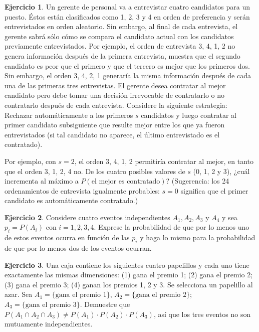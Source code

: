 \documentclass[
  11pt,
]{book}
\theoremstyle{definition}
\theoremstyle{definition}
\theoremstyle{definition}
\newtheorem{exercise}{Ejercicio}[chapter]
\theoremstyle{definition}
\theoremstyle{remark}
\begin{document}
\begin{exercise}
Un gerente de personal va a entrevistar cuatro candidatos para un puesto. Éstos están clasificados como 1, 2, 3 y 4 en orden de preferencia y serán entrevistados en orden aleatorio. Sin embargo, al final de cada entrevista, el gerente sabrá sólo cómo se compara el candidato actual con los candidatos previamente entrevistados. Por ejemplo, el orden de entrevista 3, 4, 1, 2 no genera información después de la primera entrevista, muestra que el segundo candidato es peor que el primero y que el tercero es mejor que los primeros dos. Sin embargo, el orden 3, 4, 2, 1 generaría la misma información después de cada una de las primeras tres entrevistas. El gerente desea contratar al mejor candidato pero debe tomar una decisión irrevocable de contratarlo o no contratarlo después de cada entrevista. Considere la siguiente estrategia: Rechazar automáticamente a los primeros \(s\) candidatos y luego contratar al primer candidato subsiguiente que resulte mejor entre los que ya fueron entrevistados (si tal candidato no aparece, el último entrevistado es el contratado).

Por ejemplo, con \(s = 2\), el orden 3, 4, 1, 2 permitiría contratar al mejor, en tanto que el orden 3, 1, 2, 4 no. De los cuatro posibles valores de \(s\) (0, 1, 2 y 3), ¿cuál incrementa al máximo a \(P(\text{el mejor es contratado})\)? (Sugerencia: los 24 ordenamientos de entrevista igualmente probables: \(s = 0\) significa que el primer candidato es automáticamente contratado.)
\end{exercise}

\begin{exercise}
Considere cuatro eventos independientes \(A_1, A_2, A_3\) y \(A_4\) y sea \(p_i = P(A_i)\) con \(i = 1, 2, 3, 4\). Exprese la probabilidad de que por lo menos uno de estos eventos ocurra en función de las \(p_i\) y haga lo mismo para la probabilidad de que por lo menos dos de los eventos ocurran.
\end{exercise}

\begin{exercise}
Una caja contiene los siguientes cuatro papelillos y cada uno tiene exactamente las mismas dimensiones: (1) gana el premio 1; (2) gana el premio 2; (3) gana el premio 3; (4) ganan los premios 1, 2 y 3. Se selecciona un papelillo al azar. Sea \(A_1 = \{ \text{gana el premio } 1 \}\), \(A_2 = \{ \text{gana el premio } 2 \}\); \(A_3 = \{ \text{gana el premio } 3 \}\). Demuestre que \(P(A_1 \cap A_2 \cap A_3) \neq P(A_1) \cdot P(A_2) \cdot P(A_3)\), así que los tres eventos no son mutuamente independientes.
\end{exercise}
\end{document}
